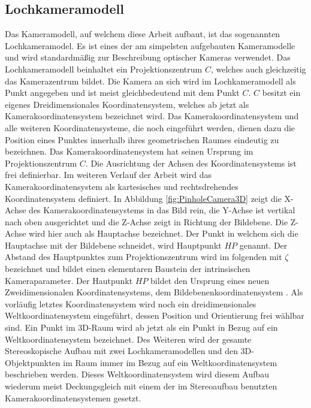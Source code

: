 \subsection{Lochkameramodell}

Das Kameramodell, auf welchem diese Arbeit aufbaut, ist das sogenannten Lochkameramodel. Es ist eines der am simpelsten aufgebauten Kameramodelle und wird standardmäßig zur Beschreibung optischer Kameras verwendet. Das Lochkameramodell beinhaltet ein Projektionszentrum $C$, welches auch gleichzeitig das Kamerazentrum bildet. Die Kamera an sich wird im Lochkameramodell als Punkt angegeben und ist meist gleichbedeutend mit dem Punkt $C$. $C$ besitzt ein eigenes Dreidimensionales Koordinatensystem, welches ab jetzt als Kamerakoordinatensystem bezeichnet wird. Das Kamerakoordinatensystem und alle weiteren Koordinatensysteme, die noch eingeführt werden, dienen dazu die Position eines Punktes innerhalb ihres geometrischen Raumes eindeutig zu bezeichnen. Das Kamerakoordinatensystem hat seinen Ursprung im Projektionszentrum $C$. Die Ausrichtung der Achsen des Koordinatensystems ist frei definierbar. Im weiteren Verlauf der Arbeit wird das Kamerakoordinatensystem als kartesisches und rechtsdrehendes Koordinatensystem definiert. In Abbildung \ref{fig:PinholeCamera3D} zeigt die X-Achse des Kamerakoordinatensystems in das Bild rein, die Y-Achse ist vertikal nach oben ausgerichtet und die Z-Achse zeigt in Richtung der Bildebene. Die Z-Achse wird hier auch als Hauptachse bezeichnet. Der Punkt in welchem sich die Hauptachse mit der Bildebene schneidet, wird Hauptpunkt $HP$ genannt. Der Abstand des Hauptpunktes zum Projektionszentrum wird im folgenden mit $\zeta$ bezeichnet und bildet einen elementaren Baustein der intrinsischen Kameraparameter. Der Hautpunkt $HP$ bildet den Ursprung eines neuen Zweidimensionalen Koordinatensystems, dem Bildebenenkoordinatensystem \cite{HZ}. Als vorläufig letztes Koordinatensystem wird noch ein dreidimensionales Weltkoordinatensystem eingeführt, dessen Position und Orientierung frei wählbar sind. Ein Punkt im 3D-Raum wird ab jetzt als ein Punkt in Bezug auf ein Weltkoordinatensystem bezeichnet. Des Weiteren wird der gesamte Stereoskopische Aufbau mit zwei Lochkameramodellen und den 3D-Objektpunkten im Raum immer im Bezug auf ein Weltkoordinatensystem beschrieben werden. Dieses Weltkoordinatensystem wird diesem Aufbau wiederum meist Deckungsgleich mit einem der im Stereoaufbau benutzten Kamerakoordinatensystemen gesetzt.


